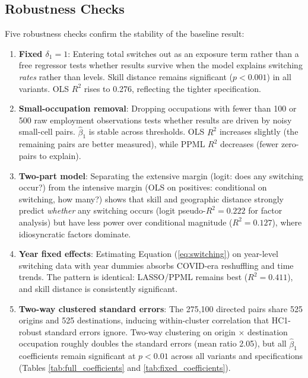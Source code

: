 \documentclass[12pt]{article}
\begin{document}
\subsection{Robustness Checks}
\label{sec:results_robust}

Five robustness checks confirm the stability of the baseline result:

\begin{enumerate}
    \item \textbf{Fixed $\delta_1 = 1$}: Entering total switches out as an exposure term rather than a free regressor tests whether results survive when the model explains switching \emph{rates} rather than levels. Skill distance remains significant ($p < 0.001$) in all variants. OLS $R^2$ rises to 0.276, reflecting the tighter specification.

    \item \textbf{Small-occupation removal}: Dropping occupations with fewer than 100 or 500 raw employment observations tests whether results are driven by noisy small-cell pairs. $\hat{\beta}_1$ is stable across thresholds. OLS $R^2$ increases slightly (the remaining pairs are better measured), while PPML $R^2$ decreases (fewer zero-pairs to explain).

    \item \textbf{Two-part model}: Separating the extensive margin (logit: does any switching occur?) from the intensive margin (OLS on positives: conditional on switching, how many?) shows that skill and geographic distance strongly predict \emph{whether} any switching occurs (logit pseudo-$R^2 = 0.222$ for factor analysis) but have less power over conditional magnitude ($R^2 = 0.127$), where idiosyncratic factors dominate.

    \item \textbf{Year fixed effects}: Estimating Equation (\ref{eq:switching}) on year-level switching data with year dummies absorbs COVID-era reshuffling and time trends. The pattern is identical: LASSO/PPML remains best ($R^2 = 0.411$), and skill distance is consistently significant.

    \item \textbf{Two-way clustered standard errors}: The 275,100 directed pairs share 525 origins and 525 destinations, inducing within-cluster correlation that HC1-robust standard errors ignore. Two-way clustering on origin $\times$ destination occupation \citep{cameron2011} roughly doubles the standard errors (mean ratio 2.05), but all $\hat{\beta}_1$ coefficients remain significant at $p < 0.01$ across all variants and specifications (Tables \ref{tab:full_coefficients} and \ref{tab:fixed_coefficients}).
\end{enumerate}
\end{document}
